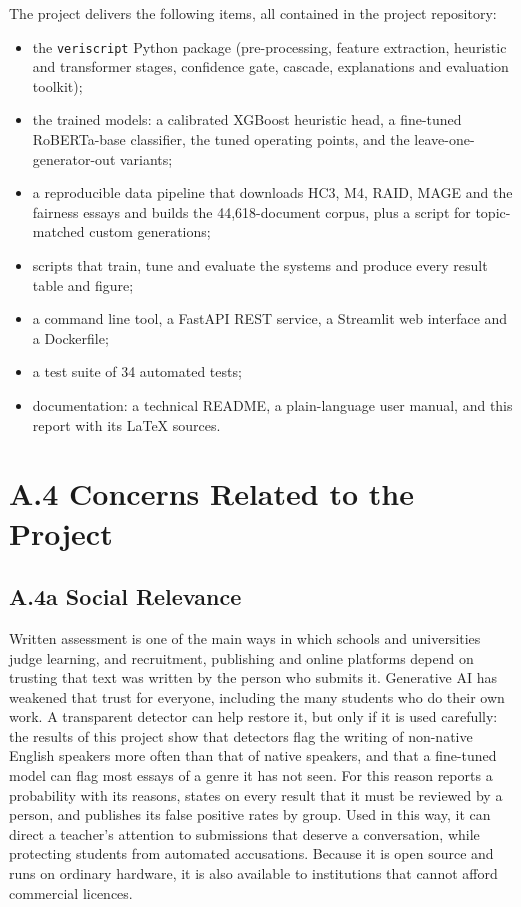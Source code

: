 The project delivers the following items, all contained in the project
repository:
\begin{itemize}
  \item the \texttt{veriscript} Python package (pre-processing, feature
        extraction, heuristic and transformer stages, confidence gate, cascade,
        explanations and evaluation toolkit);
  \item the trained models: a calibrated XGBoost heuristic head, a fine-tuned
        RoBERTa-base classifier, the tuned operating points, and the
        leave-one-generator-out variants;
  \item a reproducible data pipeline that downloads HC3, M4, RAID, MAGE and the
        fairness essays and builds the 44,618-document corpus, plus a script for
        topic-matched custom generations;
  \item scripts that train, tune and evaluate the systems and produce every
        result table and figure;
  \item a command line tool, a FastAPI REST service, a Streamlit web interface
        and a Dockerfile;
  \item a test suite of 34 automated tests;
  \item documentation: a technical README, a plain-language user manual, and
        this report with its LaTeX sources.
\end{itemize}

\section*{A.4 Concerns Related to the Project}

\subsection*{A.4a Social Relevance}

Written assessment is one of the main ways in which schools and universities
judge learning, and recruitment, publishing and online platforms depend on
trusting that text was written by the person who submits it. Generative AI has
weakened that trust for everyone, including the many students who do their own
work. A transparent detector can help restore it, but only if it is used
carefully: the results of this project show that detectors flag the writing of
non-native English speakers more often than that of native speakers, and that a
fine-tuned model can flag most essays of a genre it has not seen. For this
reason \veriscript{} reports a probability with its reasons, states on every
result that it must be reviewed by a person, and publishes its false positive
rates by group. Used in this way, it can direct a teacher's attention to
submissions that deserve a conversation, while protecting students from
automated accusations. Because it is open source and runs on ordinary hardware,
it is also available to institutions that cannot afford commercial licences.


